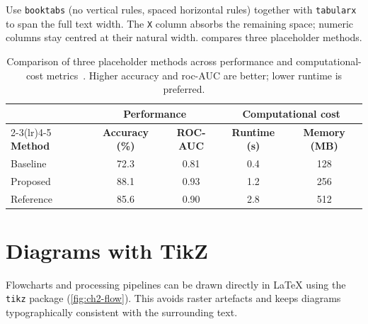 Use \texttt{booktabs} (no vertical rules, spaced horizontal rules)
together with \texttt{tabularx} to span the full text width.
The \texttt{X} column absorbs the remaining space; numeric columns
stay centred at their natural width.
 compares three placeholder methods.

\begin{table}[t]
  \centering
  \caption{Comparison of three placeholder methods across performance
           and computational-cost metrics~\cite{lecun1998}.
           Higher accuracy and \ac{roc}-AUC are better;
           lower runtime is preferred.}
  \label{tab:ch2-methods}
  \footnotesize
  \begin{tabularx}{\textwidth}{Xcccc}
    \toprule
    & \multicolumn{2}{c}{\textbf{Performance}}
    & \multicolumn{2}{c}{\textbf{Computational cost}} \\
    \cmidrule(lr){2-3}\cmidrule(lr){4-5}
    \textbf{Method}
      & \textbf{Accuracy (\%)} & \textbf{ROC-AUC}
      & \textbf{Runtime (s)}   & \textbf{Memory (MB)} \\
    \midrule
    Baseline  & 72.3 & 0.81 & 0.4 & 128 \\
    Proposed  & 88.1 & 0.93 & 1.2 & 256 \\
    Reference & 85.6 & 0.90 & 2.8 & 512 \\
    \bottomrule
  \end{tabularx}
\end{table}

\section{Diagrams with TikZ}

Flowcharts and processing pipelines can be drawn directly in \LaTeX{}
using the \texttt{tikz} package (\cref{fig:ch2-flow}).
This avoids raster artefacts and keeps diagrams typographically
consistent with the surrounding text.

